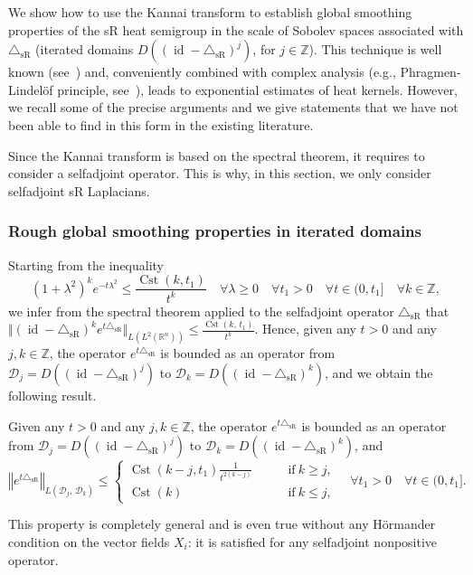 \documentclass[AHL,Unicode,published]{cedram}
\newcommand*\R{\mathbb{R}}
\newcommand*\Z{\mathbb{Z}}
\newcommand{\calD}{\mathcal{D}}
\DeclareMathOperator{\Cst}{Cst}
\DeclareMathOperator{\id}{id}
\newcommand{\trianglesR}{\triangle_{\mathrm{sR}}}
\renewcommand{\geq}{\geqslant}
\renewcommand{\leq}{\leqslant}
\let\oldforall\forall
\renewcommand*{\forall}{\mathrel{\oldforall}}
\begin{document}
We show how to use the Kannai transform to establish global smoothing properties of the sR heat semigroup in the scale of Sobolev spaces associated with $\trianglesR$ (iterated domains $D((\id-\trianglesR)^j)$, for $j\in\Z$). This technique is well known (see~\cite{CheegerGromovTaylor_1982}) and, conveniently combined with complex analysis (e.g., Phragmen-Lindel\"of principle, see~\cite{CoulhonSikora_PLMS2008}), leads to exponential estimates of heat kernels. However, we recall some of the precise arguments and we give statements that we have not been able to find in this form in the existing literature.

Since the Kannai transform is based on the spectral theorem, it requires to consider a selfadjoint operator. This is why, in this section, we only consider selfadjoint sR Laplacians.

\subsubsection{Rough global smoothing properties in iterated domains}
Starting from the inequality
\[
\left(1+\lambda^2\right)^k e^{-t\lambda^2} \leq \frac{\Cst(k,t_1)}{t^k} \quad\forall \lambda\geq 0\quad \forall t_1>0\quad \forall t\in(0,t_1] \quad \forall k\in\Z,
\]
we infer from the spectral theorem applied to the selfadjoint operator $\trianglesR$ that $\Vert (\id-\trianglesR)^k e^{t\trianglesR}\Vert_{L(L^2(\R^n))} \leq \frac{\Cst(k,\,t_1)}{t^k}$. Hence, given any $t>0$ and any $j,k\in\Z$, the operator $e^{t\trianglesR}$ is bounded as an operator from $\calD_j=D((\id-\trianglesR)^{j})$ to $\calD_k=D((\id-\trianglesR)^{k})$, and we obtain the following result.

\begin{lemm}
Given any $t>0$ and any $j,k\in\Z$, the operator $e^{t\trianglesR}$ is bounded as an operator from $\calD_j=D((\id-\trianglesR)^{j})$ to $\calD_k=D((\id-\trianglesR)^{k})$, and
\[
\left\Vert e^{t\trianglesR} \right\Vert_{L\left(\calD_j,\,\calD_k\right)} \leq
\begin{cases}
\Cst(k-j,t_1)\frac{1}{t^{2(k-j)}} \qquad & \text{if}\ k\geq j, \\[2mm]
\Cst(k) \quad & \text{if}\ k\leq j,
\end{cases}
\quad \forall t_1>0\quad\forall t\in(0,t_1].
\]
\end{lemm}

This property is completely general and is even true without any H\"ormander condition on the vector fields $X_i$: it is satisfied for any selfadjoint nonpositive operator.
\end{document}
